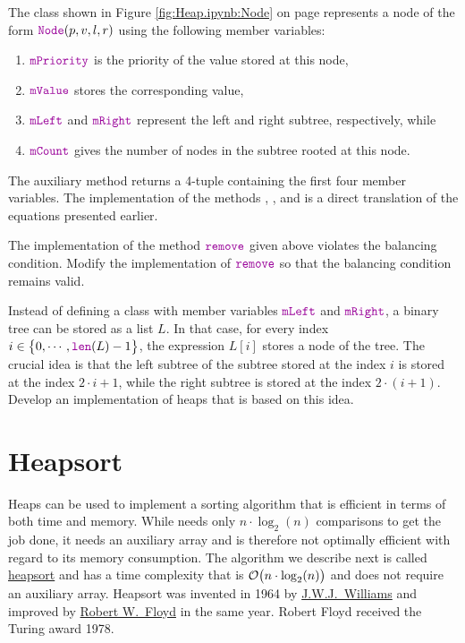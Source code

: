 The class  shown in Figure \ref{fig:Heap.ipynb:Node} on page \pageref{fig:Heap.ipynb:Node}
represents a node of the form $\mytt{Node}(p, v, l, r)$ using the following member variables:
\begin{enumerate}
\item $\mytt{mPriority}$ is the priority of the value stored at this node,
\item $\mytt{mValue}$    stores the corresponding value,
\item $\mytt{mLeft}$ and $\mytt{mRight}$ represent the left and right subtree, respectively, while
\item $\mytt{mCount}$    gives the number of nodes in the subtree rooted at this node.
\end{enumerate}
The auxiliary method  returns a 4-tuple containing the first four member variables.
The implementation of the methods , , and  is a direct translation of
the equations presented earlier.

\exercise
The implementation of the method $\mytt{remove}$ given above violates the balancing condition.
Modify the implementation of $\mytt{remove}$ so that the balancing condition remains valid. \eox

\exercise
Instead of defining a class with member variables $\mytt{mLeft}$ and $\mytt{mRight}$, a binary tree
can be stored as a list $L$.  In that case, for every index $i \in \bigl\{0, \cdots, \mytt{len}(L)-1 \bigl\}$,
the expression $L[i]$ stores a node of the tree.  The crucial idea is that the left subtree of the
subtree stored at the index $i$ is stored at the index $2 \cdot i + 1$, while the right subtree is
stored at the index $2 \cdot (i + 1)$.  Develop an implementation of heaps that is based on this idea.
\eox

\section{Heapsort \label{sec:heapsort}}
Heaps can be used to implement a sorting algorithm that is efficient in terms of both time and
memory. While  needs only $n \cdot \log_2(n)$ comparisons to get the job done, it
needs an auxiliary array and is therefore not optimally efficient with regard
to its memory consumption.  The algorithm we describe next is called
\href{https://en.wikipedia.org/wiki/Heapsort}{heapsort} and has 
a time complexity that is $\mathcal{O}\bigl(n \cdot \log_2(n)\bigr)$ and does not require an auxiliary
array.  Heapsort  was invented in 1964 by
\href{https://en.wikipedia.org/wiki/J._W._J._Williams}{J.W.J.~Williams} \cite{williams:1964}
and improved by \href{https://en.wikipedia.org/wiki/Robert_W._Floyd}{Robert W.~Floyd} \cite{floyd:1964} in the
same year.  Robert Floyd received the Turing award 1978.

